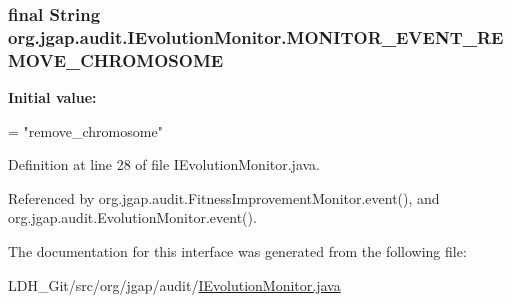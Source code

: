 \hypertarget{interfaceorg_1_1jgap_1_1audit_1_1_i_evolution_monitor_af1338d6231278758869cfd6a5e8acea5}{
\subsubsection[{M\-O\-N\-I\-T\-O\-R\-\_\-\-E\-V\-E\-N\-T\-\_\-\-R\-E\-M\-O\-V\-E\-\_\-\-C\-H\-R\-O\-M\-O\-S\-O\-M\-E}]{\setlength{\rightskip}{0pt plus 5cm}final String org.\-jgap.\-audit.\-I\-Evolution\-Monitor.\-M\-O\-N\-I\-T\-O\-R\-\_\-\-E\-V\-E\-N\-T\-\_\-\-R\-E\-M\-O\-V\-E\-\_\-\-C\-H\-R\-O\-M\-O\-S\-O\-M\-E\hspace{0.3cm}{\ttfamily [static]}}}\label{interfaceorg_1_1jgap_1_1audit_1_1_i_evolution_monitor_af1338d6231278758869cfd6a5e8acea5}
{\bfseries Initial value\-:}
\begin{DoxyCode}
=
      \textcolor{stringliteral}{"remove\_chromosome"}
\end{DoxyCode}


Definition at line 28 of file I\-Evolution\-Monitor.\-java.



Referenced by org.\-jgap.\-audit.\-Fitness\-Improvement\-Monitor.\-event(), and org.\-jgap.\-audit.\-Evolution\-Monitor.\-event().



The documentation for this interface was generated from the following file\-:\begin{DoxyCompactItemize}
\item 
L\-D\-H\-\_\-\-Git/src/org/jgap/audit/\hyperlink{_i_evolution_monitor_8java}{I\-Evolution\-Monitor.\-java}\end{DoxyCompactItemize}
